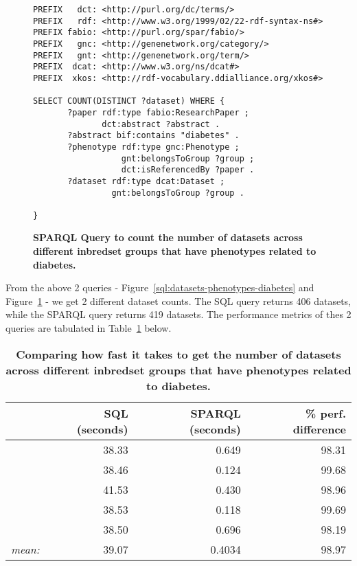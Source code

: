 \begin{figure}[H]
\centering
\begin{verbatim}
PREFIX   dct: <http://purl.org/dc/terms/>
PREFIX   rdf: <http://www.w3.org/1999/02/22-rdf-syntax-ns#>
PREFIX fabio: <http://purl.org/spar/fabio/>
PREFIX   gnc: <http://genenetwork.org/category/>
PREFIX   gnt: <http://genenetwork.org/term/>
PREFIX  dcat: <http://www.w3.org/ns/dcat#>
PREFIX  xkos: <http://rdf-vocabulary.ddialliance.org/xkos#>

SELECT COUNT(DISTINCT ?dataset) WHERE {
       ?paper rdf:type fabio:ResearchPaper ;
              dct:abstract ?abstract .
       ?abstract bif:contains "diabetes" .
       ?phenotype rdf:type gnc:Phenotype ;
                  gnt:belongsToGroup ?group ;
                  dct:isReferencedBy ?paper .
       ?dataset rdf:type dcat:Dataset ;
                gnt:belongsToGroup ?group .
                  
}
\end{verbatim}
\caption[SPARQL query to count diabetes-related phenotype datasets across different inbredset group]{\textbf{SPARQL Query to count the number of datasets across different inbredset groups that have phenotypes related to diabetes.}}\label{sparql:datasets-phenotypes-diabetes}
\end{figure}

From the above 2 queries - Figure~\ref{sql:datasets-phenotypes-diabetes} and Figure~\ref{sparql:datasets-phenotypes-diabetes} - we get 2 different dataset counts.  The SQL query returns 406 datasets, while the SPARQL query returns 419 datasets.  The performance metrics of thes 2 queries are tabulated in Table~\ref{table:perf-3} below.

\begin{table}[H]
\begin{tabular}{r|rr|r}
& SQL (seconds) & SPARQL (seconds) & \% perf. difference\\[0pt]
\toprule
& 38.33 & 0.649 & 98.31 \\[0pt]
& 38.46 & 0.124 & 99.68\\[0pt]
& 41.53 & 0.430 & 98.96\\[0pt]
& 38.53 & 0.118 & 99.69\\[0pt]
& 38.50 & 0.696 & 98.19\\[0pt]
\toprule
\textit{mean:} & 39.07 & 0.4034 & 98.97\\[0pt]
\end{tabular}
\caption[Performance comparison in seconds: Counting diabetes-related phenotype datasets across different inbredset group]{\textbf{Comparing how fast it takes to get the number of datasets across different inbredset groups that have phenotypes related to diabetes.}}\label{table:perf-3}
\end{table}

